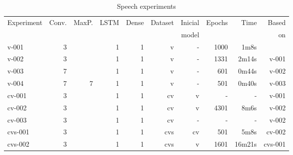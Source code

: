 \begin{table}[!ht]
    \centering
    \caption{Speech experiments}
    \label{tab:speechtimes}
\begin{tabular}{|l|r|r|r|r|r|r|r|r|r|}
\hline
Experiment & Conv.              & MaxP.      & LSTM  & Dense & Dataset & Inicial       & Epochs & Time   & Based    \\       
           &                    &            &       &       &         &         model &        &        &       on \\ \hline
v-001      &   3                &            &  1    &  1    & v       & -             & 1000   & 1m8s   &          \\ \hline
v-002      &   3                &            &  1    &  1    & v       & -             & 1331   & 2m14s  & v-001    \\ \hline
v-003      &   7                &            &  1    &  1    & v       & -             & 601    & 0m44s  & v-002    \\ \hline
v-004      &   7                & 7          &  1    &  1    & v       & -             & 501    & 0m40s  & v-003    \\ \hline
cv-001     &   3                &            &  1    &  1    & cv      & v             & -      & -      & v-001    \\ \hline
cv-002     &   3                &            &  1    &  1    & cv      & v             & 4301   & 8m6s   & v-002    \\ \hline
cv-003     &   3                &            &  1    &  1    & cv      & -             & -      & -      & v-002    \\ \hline
cvs-001    &   3                &            &  1    &  1    & cvs     & cv            & 501    & 5m8s   & cv-002   \\ \hline
cvs-002    &   3                &            &  1    &  1    & cvs     & v             & 1601   & 16m21s & cvs-001  \\ \hline
\end{tabular}
\end{table}



